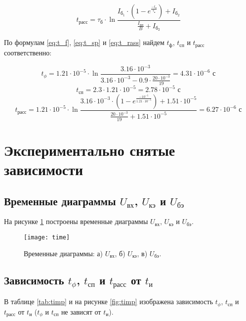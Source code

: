 \begin{equation}\label{eq:t_rass}
t_\text{расс} = \tau_{\text{б}} \cdot \ln{\frac{I_{\text{б}_1} \cdot \left( 1 - e^{\frac{-t_\text{и}}{\tau_\text{н}}} \right) + I_{\text{б}_2}}{\frac{I_\text{кн}}{B} + I_{\text{б}_2}}}
\end{equation}

По формулам \ref{eq:t_f}, \ref{eq:t_sp} и \ref{eq:t_rass} найдем $t_\text{ф}$, $t_\text{сп}$ и $t_\text{расс}$ соответственно:

\[
t_\phi = 1.21 \cdot 10^{-5} \cdot \ln{\frac{3.16 \cdot 10^{-3}}{3.16 \cdot 10^{-3} - 0.9 \cdot \frac{20 \cdot 10^{-3}}{19}}} = 4.31 \cdot 10^{-6} \text{ с}
\]
\[
t_\text{сп} = 2.3 \cdot 1.21 \cdot 10^{-5} = 2.78 \cdot 10^{-5} \text{ с}
\]
\[
t_\text{расс} = 1.21 \cdot 10^{-5} \cdot \ln{\frac{3.16 \cdot 10^{-3} \cdot \left( 1 - e^{\frac{-10^{-5}}{1.21 \cdot 10^{-5}}} \right) + 1.51 \cdot 10^{-5}}{\frac{20 \cdot 10^{-3}}{19} + 1.51 \cdot 10^{-5}}} = 6.27 \cdot 10^{-6} \text{ с}
\]

\section{Экспериментально снятые зависимости}

\subsection{Временные диаграммы $U_\text{вх}$, $U_\text{кэ}$ и $U_\text{бэ}$}

На рисунке \ref{fig:time} построены временные диаграммы $U_\text{вх}$, $U_\text{кэ}$ и $U_\text{бэ}$.
	
\begin{figure}[H]
\begin{center}
	\texttt{[image: time]}
	\caption{Временные диаграммы: а) $U_\text{вх}$, б) $U_\text{кэ}$, в) $U_\text{бэ}$.}
	\label{fig:time}
\end{center}
\end{figure}

\newpage

\subsection{Зависимость $t_\phi$, $t_\text{сп}$ и $t_\text{расс}$ от $t_\text{и}$}

В таблице \ref{tab:timp} и на рисунке \ref{fig:timp} изображена зависимость $t_\phi$, $t_\text{сп}$ и $t_\text{расс}$ от $t_\text{и}$ ($t_\phi$ и $t_\text{сп}$ не зависят от $t_\text{и}$).

